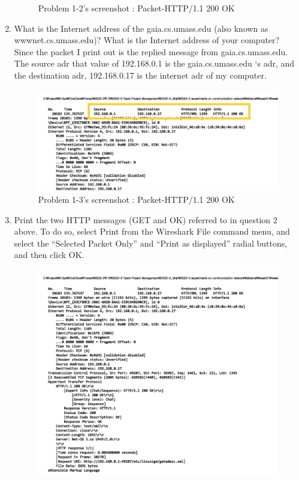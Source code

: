 \begin{enumerate}[label=\bfseries Problem \arabic*:,leftmargin=*,labelindent=1em]
\begin{figure}[!h]
        		\caption{\footnotesize Problem 1-2's screenshot : Packet-HTTP/1.1 200 OK}
        		\vspace{-10pt}
            \end{figure}
        \item What is the Internet address of the gaia.cs.umass.edu (also known as wwwnet.cs.umass.edu)? 
        What is the Internet address of your computer?\\[0.2mm]
            \soln Since the packet I print out is the replied message from gaia.cs.umass.edu.
            The source adr that value of 192.168.0.1 is the gaia.cs.umass.edu ‘s adr, and the destination adr, 192.168.0.17 is the internet adr of my computer.
\newpage
            \vspace{-4mm}  
            \begin{figure}[!h]\centering
        		\includegraphics[width=.85\textwidth]{image/result_week01/Q1-3.jpg}
        		\caption{\footnotesize Problem 1-3's screenshot : Packet-HTTP/1.1 200 OK}
        		\vspace{-10pt}
            \end{figure}
        \item Print the two HTTP messages (GET and OK) referred to in question 2 above. 
        To do so, select Print from the Wireshark File command menu, and select the “Selected Packet Only” 
        and “Print as displayed” radial buttons, and then click OK.\\[0.2mm]
            \soln 
            \vspace{-4mm}  
            \begin{figure}[!h]\centering
            \hspace{15mm} 
        		\includegraphics[width=.85\textwidth]{image/result_week01/Q1-4.jpg}

\end{figure}
\end{enumerate}

